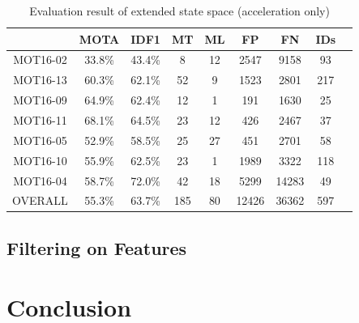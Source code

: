 \documentclass[conference]{IEEEtran}
\begin{document}
\linespread{1.2}
\begin{table}
    \caption{Evaluation result of extended state space (acceleration only)}
    \label{tab:extended-state-space}
    \begin{tabular}{ccccccccc}
        \hline
         & MOTA & IDF1 & MT & ML & FP & FN & IDs\\
        \hline
        MOT16-02 & 33.8\% & 43.4\% & 8 & 12 & 2547 & 9158 & 93\\
        MOT16-13 & 60.3\% & 62.1\% & 52 & 9 & 1523 & 2801 & 217\\
        MOT16-09 & 64.9\% & 62.4\% & 12 & 1 & 191 & 1630 & 25\\
        MOT16-11 & 68.1\% & 64.5\% & 23 & 12 & 426 & 2467 & 37\\
        MOT16-05 & 52.9\% & 58.5\% & 25 & 27 & 451 & 2701 & 58\\
        MOT16-10 & 55.9\% & 62.5\% & 23 & 1 & 1989 & 3322 & 118\\
        MOT16-04 & 58.7\% & 72.0\% & 42 & 18 & 5299 & 14283 & 49\\
        OVERALL & 55.3\% & 63.7\% & 185 & 80 & 12426 & 36362 & 597\\
        \hline
    \end{tabular}
\end{table}
\linespread{1}

\subsection{Filtering on Features}

\section{Conclusion}





\end{document}

